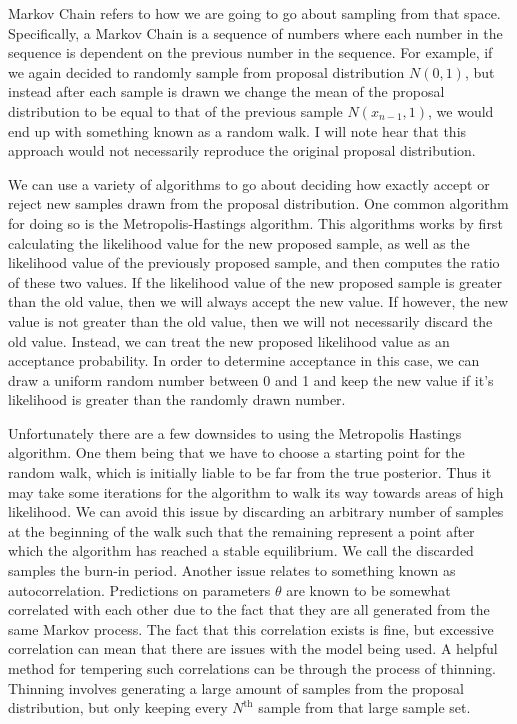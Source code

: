 %
%
Markov Chain refers to how we are going to go about sampling from that space. Specifically, a Markov Chain is a sequence of numbers where each number in the sequence is dependent on the previous number in the sequence. For example, if we again decided to randomly sample from proposal distribution $N(0,1)$, but instead after each sample is drawn we change the mean of the proposal distribution to be equal to that of the previous sample $N(x_{n-1},1)$, we would end up with something known as a random walk. I will note hear that this approach would not necessarily reproduce the original proposal distribution.

%
%

We can use a variety of algorithms to go about deciding how exactly accept or reject new samples drawn from the proposal distribution. One common algorithm for doing so is the Metropolis-Hastings algorithm. This algorithms works by first calculating the likelihood value for the new proposed sample, as well as the likelihood value of the previously proposed sample, and then computes the ratio of these two values. If the likelihood value of the new proposed sample is greater than the old value, then we will always accept the new value. If however, the new value is not greater than the old value, then we will not necessarily discard the old value. Instead, we can treat the new proposed likelihood value as an acceptance probability. In order to determine acceptance in this case, we can draw a uniform random number between 0 and 1 and keep the new value if it's likelihood is greater than the randomly drawn number.

%
%
Unfortunately there are a few downsides to using the Metropolis Hastings algorithm. One them being that we have to choose a starting point for the random walk, which is initially liable to be far from the true posterior. Thus it may take some iterations for the algorithm to walk its way towards areas of high likelihood. We can avoid this issue by discarding an arbitrary number of samples at the beginning of the walk such that the remaining represent a point after which the algorithm has reached a stable equilibrium. We call the discarded samples the burn-in period. Another issue relates to something known as autocorrelation. Predictions on parameters $\theta$ are known to be somewhat correlated with each other due to the fact that they are all generated from the same Markov process. The fact that this correlation exists is fine, but excessive correlation can mean that there are issues with the model being used. A helpful method for tempering such correlations can be through the process of thinning. Thinning involves generating a large amount of samples from the proposal distribution, but only keeping every $N^{\textrm{th}}$ sample from that large sample set. 

